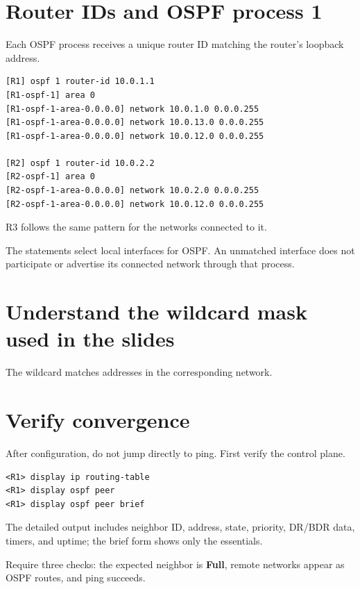 \section{Router IDs and OSPF process 1}
Each OSPF process receives a unique router ID matching the router's loopback address.

\begin{lstlisting}[style=dcnterminal]
[R1] ospf 1 router-id 10.0.1.1
[R1-ospf-1] area 0
[R1-ospf-1-area-0.0.0.0] network 10.0.1.0 0.0.0.255
[R1-ospf-1-area-0.0.0.0] network 10.0.13.0 0.0.0.255
[R1-ospf-1-area-0.0.0.0] network 10.0.12.0 0.0.0.255

[R2] ospf 1 router-id 10.0.2.2
[R2-ospf-1] area 0
[R2-ospf-1-area-0.0.0.0] network 10.0.2.0 0.0.0.255
[R2-ospf-1-area-0.0.0.0] network 10.0.12.0 0.0.0.255
\end{lstlisting}
R3 follows the same pattern for the networks connected to it.

\begin{keyidea}
The  statements select local interfaces for OSPF. An unmatched interface does not participate or advertise its connected network through that process.
\end{keyidea}

\section{Understand the wildcard mask used in the slides}
The wildcard  matches addresses in the corresponding  network.

\section{Verify convergence}
After configuration, do not jump directly to ping. First verify the control plane.
\begin{lstlisting}[style=dcnterminal]
<R1> display ip routing-table
<R1> display ospf peer
<R1> display ospf peer brief
\end{lstlisting}
The detailed output includes neighbor ID, address, state, priority, DR/BDR data, timers, and uptime; the brief form shows only the essentials.


\begin{verification}
Require three checks: the expected neighbor is \textbf{Full}, remote networks appear as OSPF routes, and ping succeeds.
\end{verification}

